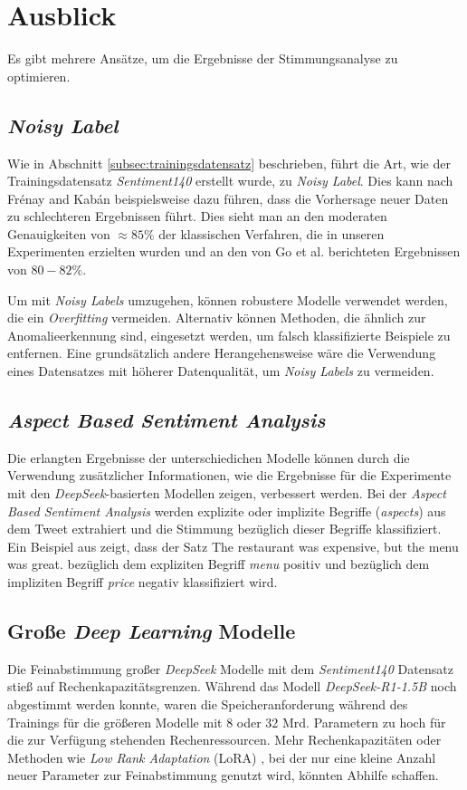 \section{Ausblick}\label{sec:ausblick}

Es gibt mehrere Ansätze, um die Ergebnisse der Stimmungsanalyse zu optimieren.

\subsection{\textit{Noisy Label}}
Wie in Abschnitt \ref{subsec:trainingsdatensatz} beschrieben, führt die Art, wie der Trainingsdatensatz \textit{Sentiment140} erstellt wurde, zu \textit{Noisy Label}.
Dies kann nach Fr{\'e}nay and Kab{\'a}n \cite{NoisyLabel2014} beispielsweise dazu führen, dass die Vorhersage neuer Daten zu schlechteren Ergebnissen führt.
Dies sieht man an den moderaten Genauigkeiten von $\approx{85}\%$ der klassischen Verfahren, die in unseren Experimenten erzielten wurden und an den von Go et al. \cite{go2009twitter} berichteten Ergebnissen von $80-82\%$.

Um mit \textit{Noisy Labels} umzugehen, können robustere Modelle verwendet werden, die ein \textit{Overfitting} vermeiden.
Alternativ können Methoden, die ähnlich zur Anomalieerkennung sind, eingesetzt werden, um falsch klassifizierte Beispiele zu entfernen.
Eine grundsätzlich andere Herangehensweise wäre die Verwendung eines Datensatzes mit höherer Datenqualität, um \textit{Noisy Labels} zu vermeiden.

\subsection{\textit{Aspect Based Sentiment Analysis}}

Die erlangten Ergebnisse der unterschiedichen Modelle können durch die Verwendung zusätzlicher Informationen, wie die Ergebnisse für die Experimente mit den \textit{DeepSeek}-basierten Modellen zeigen, verbessert werden.
Bei der \textit{Aspect Based Sentiment Analysis} werden explizite oder implizite Begriffe (\textit{aspects}) aus dem Tweet extrahiert und die Stimmung bezüglich dieser Begriffe klassifiziert.
Ein Beispiel aus \cite{Hua_2024} zeigt, dass der Satz \glqq The restaurant was expensive, but the menu was great.\grqq{} bezüglich dem expliziten Begriff \textit{menu} positiv und bezüglich dem impliziten Begriff \textit{price} negativ klassifiziert wird.

\subsection{Große \textit{Deep Learning} Modelle}

Die Feinabstimmung großer \textit{DeepSeek} Modelle mit dem \textit{Sentiment140} Datensatz stieß auf Rechenkapazitätsgrenzen.
Während das Modell \textit{DeepSeek-R1-1.5B} noch abgestimmt werden konnte, waren die Speicheranforderung während des Trainings für die größeren Modelle mit 8 oder 32 Mrd. Parametern zu hoch für die zur Verfügung stehenden Rechenressourcen.
Mehr Rechenkapazitäten oder Methoden wie \textit{Low Rank Adaptation} (LoRA) \cite{lora2021}, bei der nur eine kleine Anzahl neuer Parameter zur Feinabstimmung genutzt wird, könnten Abhilfe schaffen.
